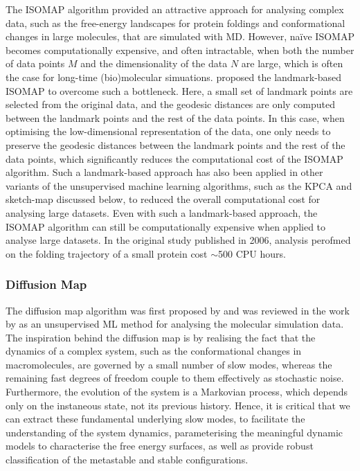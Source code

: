 The ISOMAP algorithm provided an attractive approach for analysing complex data, such as the free-energy landscapes for protein foldings and conformational changes in large molecules, that are simulated with MD. However, na\"{i}ve ISOMAP becomes computationally expensive, and often intractable, when both the number of data points $M$ and the dimensionality of the data $N$ are large, which is often the case for long-time (bio)molecular simuations. \cite{das2006low} proposed the landmark-based ISOMAP to overcome such a bottleneck. Here, a small set of landmark points are selected from the original data, and the geodesic distances are only computed between the landmark points and the rest of the data points. In this case, when optimising the low-dimensional representation of the data, one only needs to preserve the geodesic distances between the landmark points and the rest of the data points, which significantly reduces the computational cost of the ISOMAP algorithm. Such a landmark-based approach has also been applied in other variants of the unsupervised machine learning algorithms, such as the  KPCA\cite{zeng2023mechanistic} and sketch-map\cite{ceriotti2011simplifying} discussed below, to reduced the overall computational cost for analysing large datasets. Even with such a landmark-based approach, the ISOMAP algorithm can still be computationally expensive when applied to analyse large datasets. In the original study published in 2006,\cite{das2006low} analysis perofmed on the folding trajectory of a small protein cost $\sim$500 CPU hours.
 
\subsubsection{Diffusion Map}
\label{appendix:diffusion_map}

The diffusion map algorithm was first proposed by \citet{coifman2006diffusion} and was reviewed in the work by \citet{ferguson2011nonlinear} as an unsupervised ML method for analysing the molecular simulation data. The inspiration behind the diffusion map is by realising the fact that the dynamics of a complex system, such as the conformational changes in macromolecules, are governed by a small number of slow modes, whereas the remaining fast degrees of freedom couple to them effectively as stochastic noise. Furthermore, the evolution of the system is a Markovian process, which depends only on the instaneous state, not its previous history. Hence, it is critical that we can extract these fundamental underlying slow modes, to facilitate the understanding of the system dynamics,  parameterising the meaningful dynamic models to characterise the free energy surfaces, as well as provide robust classification of the metastable and stable configurations. 

